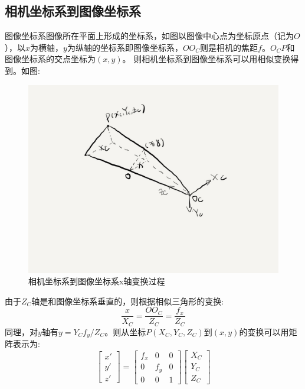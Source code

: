 \documentclass[12pt]{book}
\begin{document}
\subsection{相机坐标系到图像坐标系}
图像坐标系图像所在平面上形成的坐标系，如图以图像中心点为坐标原点（记为$O$），以$x$为横轴，$y$为纵轴的坐标系即图像坐标系，$OO_C$则是相机的焦距$f$。$O_CP$和图像坐标系的交点坐标为$(x,y)$。 则相机坐标系到图像坐标系可以用相似变换得到。如图:
\begin{figure}[H]
	\centering
	\includegraphics[width=1.0\textwidth]{images/camera_to_image_x.jpg}
	\caption{相机坐标系到图像坐标系x轴变换过程}
	\label{camera-to-image-x}
\end{figure}
由于$Z_C$轴是和图像坐标系垂直的，则根据相似三角形的变换:
\begin{equation}\label{camera_to_image_x}
\frac{x}{{{X_C}}} = \frac{{O{O_C}}}{{{Z_C}}} = \frac{{{f_x}}}{{{Z_C}}}
\end{equation}
同理，对$y$轴有$y={Y_C}{f_y}/{Z_C}$。则从坐标$P({X_C},{Y_C},{Z_C})$到$(x, y)$的变换可以用矩阵表示为:
\begin{equation}\label{camera_to_image_without_translation}
	\left[ {\begin{array}{*{20}{c}}
			{x'}\\
			{y'}\\
			{z'}
	\end{array}} \right] = \left[ {\begin{array}{*{20}{c}}
			{{f_x}}&0&0\\
			0&{{f_y}}&0\\
			0&0&1
	\end{array}} \right]\left[ {\begin{array}{*{20}{c}}
			{{X_C}}\\
			{{Y_C}}\\
			{{Z_C}}
	\end{array}} \right]
\end{equation}
\end{document}
